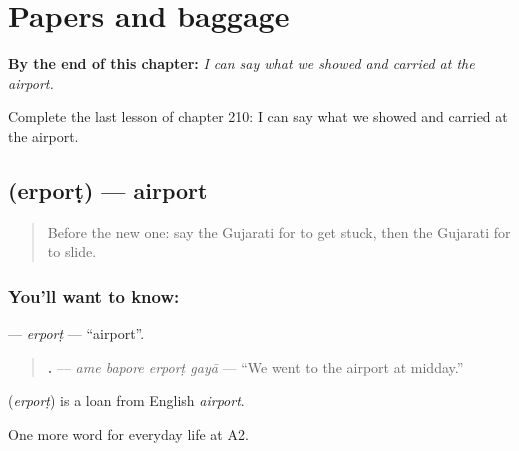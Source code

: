 
\chapter{Papers and baggage}
\label{ch:gu-papers-and-baggage}

\begin{chapteropening}
\textbf{By the end of this chapter:} \emph{I can say what we showed and carried at the airport.}

Complete the last lesson of chapter 210: I can say what we showed and carried at the airport.
\end{chapteropening}

\section[\texorpdfstring{\gu{એરપોર્ટ} (erporṭ)}{એરપોર્ટ (erporṭ)}]{ (erporṭ) — airport}

\label{lesson:GU-C210-erport}



\begin{quote}
Before the new one: say the Gujarati for to get stuck, then the Gujarati for to slide.
\end{quote}

\subsection*{You'll want to know: }
\textbf{} — \emph{erporṭ} — \textquotedblleft{}airport\textquotedblright{}.

\begin{quote}
\textbf{   .} — \emph{ame bapore erporṭ gayā} — \textquotedblleft{}We went to the airport at midday.\textquotedblright{}
\end{quote}

\begin{cousinweb}
\textbf{} (\emph{erporṭ}) is a loan from English \emph{airport}.
\end{cousinweb}

\begin{grammarlens}[title={What you've built}]
One more word for everyday life at A2.
\end{grammarlens}

